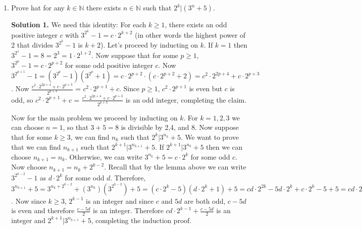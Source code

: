\documentclass[11pt]{article}
\begin{document}
\begin{enumerate}
\emph {Scenario 3.} Suppose that both scenarios 1 and 2 didn't happen, then there exists $N$ such that for all $k\ge N$, $b_k=3$. Let $m=a_N$, which ends with digit 3. If $3|m$ then $3|a_k$ for all $k\ge N$, hence $a_k$ composite except for at most once $a_k$ with $a_k=3$. Now let's assume $3\nmid m$. We can see that $\gcd (10, m)=1$ since $m$, which ends with digit 3, is divisible by neither 2 nor 5. Now, by Euler-Fermat theorem, for all positive integers $j$, $10^{j\phi(m)}=(10^{\phi (m)})^j\equiv 1^j\equiv 1\pmod {m}$, and we know the number $\underbrace{33\cdots 3}_{j\phi(m)\text{ times}}=3(\frac{10^{j\phi(m)}-1}{9})=\frac{10^{j\phi(m)}-1}{3}$  is divisible by $m$ since $m|10^{j\phi(m)}-1$ and $\gcd (m,3)=1$. Now for all $j\ge 1$, $a_{N+j\phi(m)}=a_N(10^{j\phi(m)})+\frac{10^{j\phi(m)}-1}{3}$ = $m(10^{j\phi(m)})+\frac{10^{j\phi(m)}-1}{3}$ is divisible by $m$ and greater than $m$ (since $\phi (m)\ge 1$), hence is composite (as $m\ge 3>1$). Q.E.D.

Notice that if we allow for both 3 and 9, then we might not be able to guarantee the existence of infinitely many composite numbers in scenario 3.

\item Prove hat for any $k\in\mathbb{N}$ there exists $n\in\mathbb{N}$ such that $2^k|(3^n+5)$.

\textbf {Solution 1.} We need this identity: For each $k\ge 1$, there exists an odd positive integer $c$ with $3^{2^k}-1=c\cdot 2^{k+2}$ (in other words the highest power of 2 that divides $3^{2^k}-1$ is $k+2$). Let's proceed by inducting on $k$. If $k=1$ then $3^{2^1}-1=8=2^3=1\cdot 2^{1+2}$. Now suppose that for some $p\ge 1$, $3^{2^p}-1=c\cdot 2^{p+2}$ for some odd positive integer $c$. Now $3^{2^{p+1}}-1=(3^{2^p}-1)(3^{2^p}+1)=c\cdot 2^{p+2}\cdot(c\cdot 2^{p+2}+2) = c^2\cdot 2^{2p+4}+ c\cdot 2^{p+3}$. Now $\frac{c^2\cdot 2^{2p+4}+ c\cdot 2^{p+3}}{2^{p+3}}$ = $c^2\cdot 2^{p+1}+c.$ Since $p\ge 1$, $c^2\cdot 2^{p+1}$ is even but $c$ is odd, so $c^2\cdot 2^{p+1}+c$ = $\frac{c^2\cdot 2^{2p+4}+ c\cdot 2^{p+3}}{2^{p+3}}$ is an odd integer, completing the claim.

Now for the main problem we proceed by inducting on $k$. For $k=1,2,3$ we can choose $n=1$, so that $3+5=8$ is divisible by 2,4, and 8. Now suppose that for some $k\ge 3$, we can find $n_k$ such that $2^k|3^{n_k}+5$. We want to prove that we can find $n_{k+1}$ such that $2^{k+1}|3^{n_{k+1}}+5.$ If $2^{k+1}|3^{n_k}+5$ then we can choose $n_{k+1}=n_k$. Otherwise, we can write $3^{n_k}+5=c\cdot 2^k$ for some odd $c$. Now choose $n_{k+1}=n_k+2^{k-2}$. Recall that by the lemma above we can write $3^{2^{k-2}}-1$ as $d\cdot 2^k$ for some odd $d$. Therefore, $3^{n_{k+1}}+5=3^{n_k+2^{k-2}}+(3^{n_k})(3^{2^{k-2}})+5=(c\cdot 2^k-5)(d\cdot 2^k+1)+5=cd\cdot 2^{2k}-5d\cdot 2^k+c\cdot 2^k -5 +5 = cd\cdot 2^{2k}+(c-5d)\cdot 2^k = (2^{k+1})(cd\cdot 2^{k-1}+\frac{c-5d}{2})$. Now since $k\ge 3$, $2^{k-1}$ is an integer and since $c$ and $5d$ are both odd, $c-5d$ is even and therefore $\frac{c-5d}{2}$ is an integer. Therefore $cd\cdot 2^{k-1}+\frac{c-5d}{2}$ is an integer and $2^{k+1}|3^{n_{k+1}}+5$, completing the induction proof.


\end{enumerate}
\end{document}
